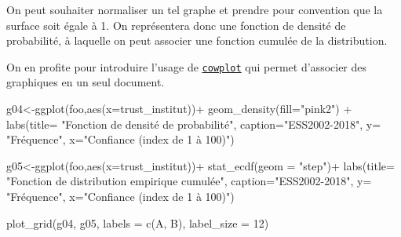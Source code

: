 \documentclass[
]{book}
\newenvironment{Shaded}{\begin{snugshade}}{\end{snugshade}}
\newcommand{\AttributeTok}[1]{\textcolor[rgb]{0.77,0.63,0.00}{#1}}
\newcommand{\DecValTok}[1]{\textcolor[rgb]{0.00,0.00,0.81}{#1}}
\newcommand{\FunctionTok}[1]{\textcolor[rgb]{0.00,0.00,0.00}{#1}}
\newcommand{\NormalTok}[1]{#1}
\newcommand{\OtherTok}[1]{\textcolor[rgb]{0.56,0.35,0.01}{#1}}
\newcommand{\SpecialCharTok}[1]{\textcolor[rgb]{0.00,0.00,0.00}{#1}}
\newcommand{\StringTok}[1]{\textcolor[rgb]{0.31,0.60,0.02}{#1}}
\begin{document}
On peut souhaiter normaliser un tel graphe et prendre pour convention que la surface soit égale à 1. On représentera donc une fonction de densité de probabilité, à laquelle on peut associer une fonction cumulée de la distribution.

On en profite pour introduire l'usage de \href{https://cran.r-project.org/web/packages/cowplot/vignettes/introduction.html}{\texttt{cowplot}} qui permet d'associer des graphiques en un seul document.

\begin{Shaded}
\begin{Highlighting}[]
\NormalTok{g04}\OtherTok{\textless{}{-}}\FunctionTok{ggplot}\NormalTok{(foo,}\FunctionTok{aes}\NormalTok{(}\AttributeTok{x=}\NormalTok{trust\_institut))}\SpecialCharTok{+} 
  \FunctionTok{geom\_density}\NormalTok{(}\AttributeTok{fill=}\StringTok{"pink2"}\NormalTok{) }\SpecialCharTok{+}
  \FunctionTok{labs}\NormalTok{(}\AttributeTok{title=} \StringTok{"Fonction de densité de probabilité"}\NormalTok{, }
       \AttributeTok{caption=}\StringTok{"ESS2002{-}2018"}\NormalTok{,}
       \AttributeTok{y=} \StringTok{"Fréquence"}\NormalTok{,}
       \AttributeTok{x=}\StringTok{"Confiance (index de 1 à 100)"}\NormalTok{) }

\NormalTok{g05}\OtherTok{\textless{}{-}}\FunctionTok{ggplot}\NormalTok{(foo,}\FunctionTok{aes}\NormalTok{(}\AttributeTok{x=}\NormalTok{trust\_institut))}\SpecialCharTok{+} 
  \FunctionTok{stat\_ecdf}\NormalTok{(}\AttributeTok{geom =} \StringTok{"step"}\NormalTok{)}\SpecialCharTok{+}
  \FunctionTok{labs}\NormalTok{(}\AttributeTok{title=} \StringTok{"Fonction de distribution empirique cumulée"}\NormalTok{, }
       \AttributeTok{caption=}\StringTok{"ESS2002{-}2018"}\NormalTok{,}
       \AttributeTok{y=} \StringTok{"Fréquence"}\NormalTok{,}
       \AttributeTok{x=}\StringTok{"Confiance (index de 1 à 100)"}\NormalTok{) }

\FunctionTok{plot\_grid}\NormalTok{(g04, g05, }\AttributeTok{labels =} \FunctionTok{c}\NormalTok{(}\StringTok{\textquotesingle{}A\textquotesingle{}}\NormalTok{, }\StringTok{\textquotesingle{}B\textquotesingle{}}\NormalTok{), }\AttributeTok{label\_size =} \DecValTok{12}\NormalTok{)}
\end{Highlighting}
\end{Shaded}
\end{document}
